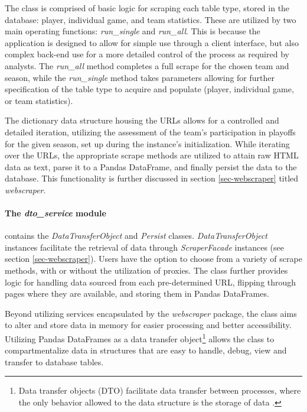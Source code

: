 \documentclass{thesis-ekf}
\theoremstyle{definition}
\theoremstyle{remark}
\begin{document}
The class is comprised of basic logic for scraping each table type, stored in the database: player, individual game, and team statistics. These are utilized by two main operating functions: \emph{run\_single} and \emph{run\_all}. This is because the application is designed to allow for simple use through a client interface, but also complex back-end use for a more detailed control of the process as required by analysts. The \emph{run\_all} method completes a full scrape for the chosen team and season, while the \emph{run\_single} method takes parameters allowing for further specification of the table type to acquire and populate (player, individual game, or team statistics).

The dictionary data structure housing the URLs allows for a controlled and detailed iteration, utilizing the assessment of the team's participation in playoffs for the given season, set up during the instance's initialization. While iterating over the URLs, the appropriate scrape methods are utilized to attain raw HTML data as text, parse it to a Pandas DataFrame, and finally persist the data to the database. This functionality is further discussed in section \ref{sec-webscraper} titled \emph{webscraper}.

\paragraph{The \emph{dto\_service} module} contains the \emph{DataTransferObject}\label{element-dto} and \emph{Persist} classes. \emph{DataTransferObject} instances facilitate the retrieval of data through \emph{ScraperFacade} instances (see section \ref{sec-webscraper}). Users have the option to choose from a variety of scrape methods, with or without the utilization of proxies. The class further provides logic for handling data sourced from each pre-determined URL, flipping through pages where they are available, and storing them in Pandas DataFrames. 

Beyond utilizing services encapsulated by the \emph{webscraper} package, the class aims to alter and store data in memory for easier processing and better accessibility. Utilizing Pandas DataFrames as a data transfer object\footnote{Data transfer objects (DTO) facilitate data transfer between processes, where the only behavior allowed to the data structure is the storage of data \cite{dto-wiki}.} allows the class to compartmentalize data in structures that are easy to handle, debug, view and transfer to database tables.
\end{document}
